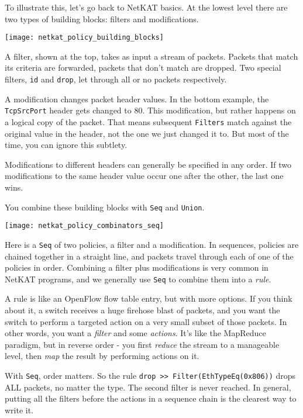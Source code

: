 To illustrate this, let's go back to NetKAT basics.  At the lowest level there are two types
of building blocks: filters and modifications.  

\texttt{[image: netkat\_policy\_building\_blocks]}

A filter, shown at the top, takes as input a stream of packets.  Packets that match its criteria are
forwarded, packets that don't match are dropped.  Two special filters, \texttt{id} and \texttt{drop}, 
let through all or no packets respectively.  

A modification changes packet header values.  In the bottom example, the \texttt{TcpSrcPort} header gets
changed to 80.  This modification, but rather happens on a logical copy of the packet.  That means subsequent \texttt{Filters} match against the original value in the header, not the one we just changed it to.  But most of the 
time, you can ignore this subtlety.

Modifications to different headers can generally be specified in any order.  If two modifications to the same header 
value occur one after the other, the last one wins. 

You combine these building blocks with \texttt{Seq} and \texttt{Union}.

\texttt{[image: netkat\_policy\_combinators\_seq]}

Here is a \texttt{Seq} of two policies, a filter and a modification.   In sequences, policies
are chained together in a straight line, and packets travel through each of one of the policies in order.  
Combining a filter plus modifications is very common in NetKAT programs, and we generally
use \texttt{Seq} to combine them into a \emph{rule}.  

A rule is like an OpenFlow flow table entry, but with more options.  
If you think about it, a switch receives a huge firehose blast of packets, and you want the switch to 
perform a targeted action on a very small subset of those packets. 
In other words, you want a \emph{filter} and some \emph{actions}.
It's like the MapReduce paradigm, but in reverse order - you first \emph{reduce} the stream to a manageable level,
then \emph{map} the result by performing actions on it.  

With \texttt{Seq}, order matters.  So the rule \texttt{drop >> Filter(EthTypeEq(0x806))} 
drops ALL packets, no matter the type.  
The second filter is never reached.  
In general, putting all the filters before the actions in a sequence chain is the clearest way to write it.

